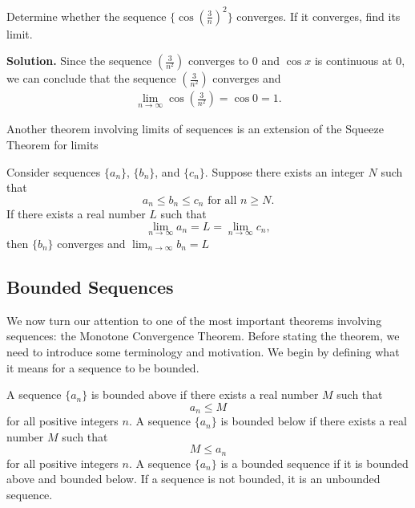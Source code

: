 \documentclass{report}
\begin{document}
      \bigbreak \noindent 
      \begin{eg}
          Determine whether the sequence  $\{\cos{\left(\frac{3}{n}\right)^{2}}\} $ converges. If it converges, find its limit.
      \end{eg}
      \bigbreak \noindent 
      \textbf{Solution.} Since the sequence $\left(\frac{3}{n^{2}}\right) $ converges to 0 and $\cos{x}$ is continuous at 0, we can conclude that the sequence $\left(\frac{3}{n^{2}}\right) $ converges and
      \begin{align*}
          \lim\limits_{n \to\infty }{\cos{\left(\frac{3}{n^{2}}\right)}}= \cos{0} = 1
      .\end{align*}
      

      \bigbreak \noindent 
      Another theorem involving limits of sequences is an extension of the Squeeze Theorem for limits 
      \bigbreak \noindent 
      \begin{thrm}
          Consider sequences \( \{a_n\} \), \( \{b_n\} \), and \( \{c_n\} \). Suppose there exists an integer \( N \) such that
        \[ a_n \leq b_n \leq c_n \text{ for all } n \geq N. \]
        If there exists a real number \( L \) such that
        \[ \lim_{{n \to \infty}} a_n = L = \lim_{{n \to \infty}} c_n, \]
        then \( \{b_n\} \) converges and \( \lim_{{n \to \infty}} b_n = L \)
      \end{thrm}

      \pagebreak 
      \subsection*{Bounded Sequences}
      \bigbreak \noindent 
      We now turn our attention to one of the most important theorems involving sequences: the Monotone Convergence Theorem. Before stating the theorem, we need to introduce some terminology and motivation. We begin by defining what it means for a sequence to be bounded.

      \bigbreak \noindent 
      \begin{definition}
          A sequence \( \{a_n\} \) is bounded above if there exists a real number \( M \) such that
        \[ a_n \leq M \]
        for all positive integers \( n \).
        \bigbreak \noindent 
        A sequence \( \{a_n\} \) is bounded below if there exists a real number \( M \) such that
        \[ M \leq a_n \]
        for all positive integers \( n \).
        \bigbreak \noindent 
        A sequence \( \{a_n\} \) is a bounded sequence if it is bounded above and bounded below.
        \bigbreak \noindent 
        If a sequence is not bounded, it is an unbounded sequence.
      \end{definition}
\end{document}
